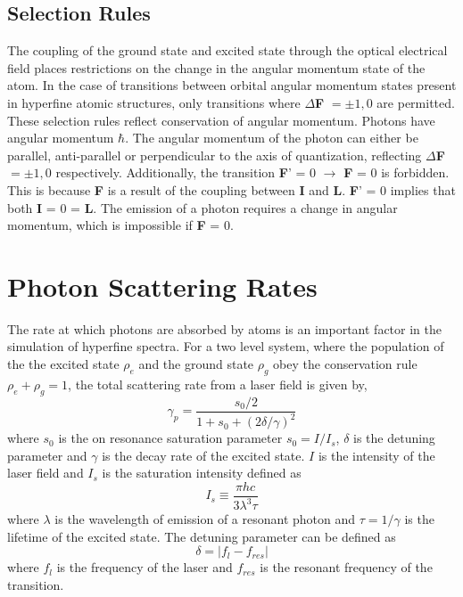 \subsection{Selection Rules}
The coupling of the ground state and excited state through the optical electrical field places restrictions on the change in the angular momentum state of the atom. In the case of transitions between orbital angular momentum states present in hyperfine atomic structures, only transitions where $\Delta$\textbf{F}  $=\pm1,0$ are permitted. These selection rules reflect conservation of angular momentum. Photons have angular momentum $\hbar$. The angular momentum of the photon can either be parallel, anti-parallel or perpendicular to the axis of quantization, reflecting $\Delta$\textbf{F}$=\pm1,0$ respectively. Additionally, the transition \textbf{F}' = 0 $\rightarrow$ \textbf{F} = 0 is forbidden. This is because \textbf{F} is a result of the coupling between \textbf{I} and \textbf{L}. \textbf{F}' = 0 implies that both \textbf{I} = 0 = \textbf{L}. The emission of a photon requires a change in angular momentum, which is impossible if \textbf{F} = 0.

\section{Photon Scattering Rates}
The rate at which photons are absorbed by atoms is an important factor in the simulation of hyperfine spectra. For a two level system, where the population of the the excited state $\rho_{e}$ and the ground state $\rho_{g}$ obey the conservation rule $\rho_e +\rho_g = 1$, the total scattering rate from a laser field is given by,
\begin{equation}
\gamma_p =  \frac{s_0/2}{1+s_0+(2\delta/\gamma)^2}
\end{equation}
where $s_0$ is the on resonance saturation parameter $s_0 = I/I_s$, $\delta$ is the detuning parameter and $\gamma$ is the decay rate of the excited state. $I$ is the intensity of the laser field and $I_s$ is the saturation intensity defined as
\begin{equation}
I_s \equiv \frac{\pi h c}{3 \lambda^3 \tau}
\end{equation}
where $\lambda$ is the wavelength of emission of a resonant photon and $\tau = 1/\gamma$ is the lifetime of the excited state. The detuning parameter can be defined as
\begin{equation}
\delta =|f_{l} - f_{res}|
\end{equation}
where $f_l$ is the frequency of the laser and $f_{res}$ is the resonant frequency of the transition.
